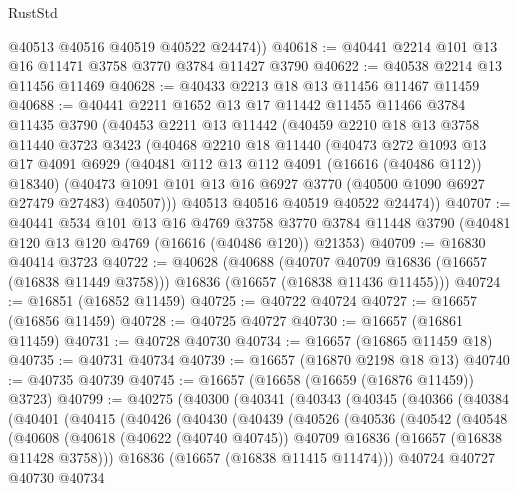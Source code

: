\begin{lexlean}{RustStd}
\begin{coremodule}
        @40513
        @40516
        @40519
        @40522
        @24474))
@40618 := @40441 @2214 @101 @13 @16 @11471 @3758 @3770 @3784 @11427 @3790
@40622 := @40538 @2214 @13 @11456 @11469
@40628 := @40433 @2213 @18 @13 @11456 @11467 @11459
@40688 := @40441
    @2211
    @1652
    @13
    @17
    @11442
    @11455
    @11466
    @3784
    @11435
    @3790
    (@40453
      @2211
      @13
      @11442
      (@40459
        @2210
        @18
        @13
        @3758
        @11440
        @3723
        @3423
        (@40468
          @2210
          @18
          @11440
          (@40473
            @272
            @1093
            @13
            @17
            @4091
            @6929
            (@40481 @112 @13 @112 @4091 (@16616 (@40486 @112)) @18340)
            (@40473 @1091 @101 @13 @16 @6927 @3770 (@40500 @1090 @6927 @27479 @27483) @40507)))
        @40513
        @40516
        @40519
        @40522
        @24474))
@40707 := @40441
    @534
    @101
    @13
    @16
    @4769
    @3758
    @3770
    @3784
    @11448
    @3790
    (@40481 @120 @13 @120 @4769 (@16616 (@40486 @120)) @21353)
@40709 := @16830 @40414 @3723
@40722 := @40628
    (@40688
      (@40707 @40709 @16836 (@16657 (@16838 @11449 @3758)))
      @16836
      (@16657 (@16838 @11436 @11455)))
@40724 := @16851 (@16852 @11459)
@40725 := @40722 @40724
@40727 := @16657 (@16856 @11459)
@40728 := @40725 @40727
@40730 := @16657 (@16861 @11459)
@40731 := @40728 @40730
@40734 := @16657 (@16865 @11459 @18)
@40735 := @40731 @40734
@40739 := @16657 (@16870 @2198 @18 @13)
@40740 := @40735 @40739
@40745 := @16657 (@16658 (@16659 (@16876 @11459)) @3723)
@40799 := @40275
    (@40300
      (@40341
        (@40343
          (@40345
            (@40366
              (@40384
                (@40401
                  (@40415
                    (@40426
                      (@40430
                        (@40439
                          (@40526
                            (@40536
                              (@40542
                                (@40548
                                  (@40608
                                    (@40618
                                      (@40622 (@40740 @40745))
                                      @40709
                                      @16836
                                      (@16657 (@16838 @11428 @3758)))
                                    @16836
                                    (@16657 (@16838 @11415 @11474)))
                                  @40724
                                  @40727
                                  @40730
                                  @40734

\end{coremodule}
\end{lexlean}
